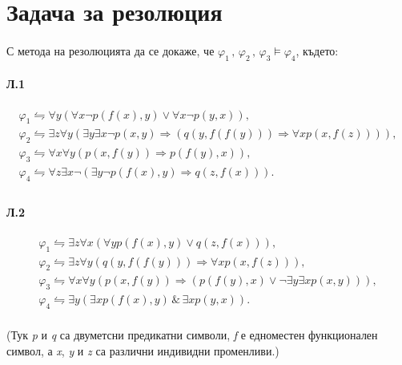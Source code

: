 \documentclass[12pt]{article}
\begin{document}
\vskip 0.2in

\newpage
\section{Задача за резолюция}
\paragraph{}
С метода на резолюцията да се докаже, че $\varphi_1\,,\,\varphi_2\,,\,\varphi_3\models\varphi_4$, където:
\paragraph{\hspace{0.5em} Л.1} 
\begin{addmargin}[1em]{2em}
\begin{gather*}
\varphi_1 \leftrightharpoons \forall y(\forall x\neg p(f(x), y)\lor \forall x \neg p(y,x)),\\
\varphi_2 \leftrightharpoons \exists z \forall y(\exists y \exists x\neg p(x,y) \Longrightarrow (q(y,f(f(y))) \Longrightarrow \forall x p(x,f(z)))),\\
\varphi_3 \leftrightharpoons \forall x\forall y (p(x, f(y)) \Longrightarrow p(f(y),x)),\\
\varphi_4 \leftrightharpoons \forall z\exists x \neg (\exists y \neg p(f(x),y)\Longrightarrow q(z,f(x))).\\
\end{gather*}
\end{addmargin}

\paragraph{\hspace{0.5em} Л.2} 
\begin{addmargin}[1em]{2em}
    \begin{gather*}
        \varphi_1 \leftrightharpoons \exists z \forall x (\forall y p(f(x), y) \lor q(z,f(x))),\\
        \varphi_2 \leftrightharpoons \exists z \forall y(q(y,f(f(y)))\Longrightarrow \forall x p(x,f(z))),\\
        \varphi_3 \leftrightharpoons \forall x\forall y (p(x, f(y)) \Longrightarrow (p(f(y),x) \lor \neg \exists y \exists x p(x,y))),\\
        \varphi_4 \leftrightharpoons \exists y(\exists x p(f(x),y)\,\&\,\exists x p(y,x)).\\
    \end{gather*}
\end{addmargin}
(Тук \textit{p} и \textit{q} са двуметсни предикатни символи, \textit{f} е едноместен функционален символ, а \textit{x}, \textit{y} и \textit{z} са различни индивидни променливи.)
\end{document}
